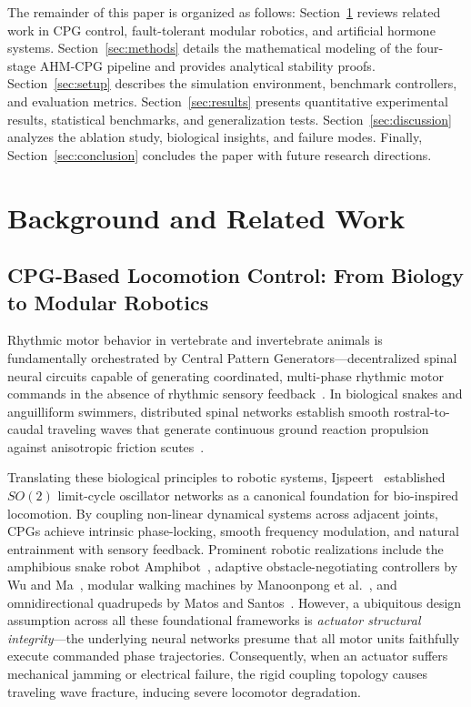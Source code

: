 \documentclass{iopjournal}
\begin{document}
The remainder of this paper is organized as follows: Section~\ref{sec:related} reviews related work in CPG control, fault-tolerant modular robotics, and artificial hormone systems. Section~\ref{sec:methods} details the mathematical modeling of the four-stage AHM-CPG pipeline and provides analytical stability proofs. Section~\ref{sec:setup} describes the simulation environment, benchmark controllers, and evaluation metrics. Section~\ref{sec:results} presents quantitative experimental results, statistical benchmarks, and generalization tests. Section~\ref{sec:discussion} analyzes the ablation study, biological insights, and failure modes. Finally, Section~\ref{sec:conclusion} concludes the paper with future research directions.

\section{Background and Related Work}
\label{sec:related}

\subsection{CPG-Based Locomotion Control: From Biology to Modular Robotics}
Rhythmic motor behavior in vertebrate and invertebrate animals is fundamentally orchestrated by Central Pattern Generators—decentralized spinal neural circuits capable of generating coordinated, multi-phase rhythmic motor commands in the absence of rhythmic sensory feedback~\cite{grillner2006,marder2001,delcomyn1980}. In biological snakes and anguilliform swimmers, distributed spinal networks establish smooth rostral-to-caudal traveling waves that generate continuous ground reaction propulsion against anisotropic friction scutes~\cite{dickinson2000,hirose1993}.

Translating these biological principles to robotic systems, Ijspeert~\cite{ijspeert2008} established $SO(2)$ limit-cycle oscillator networks as a canonical foundation for bio-inspired locomotion. By coupling non-linear dynamical systems across adjacent joints, CPGs achieve intrinsic phase-locking, smooth frequency modulation, and natural entrainment with sensory feedback. Prominent robotic realizations include the amphibious snake robot Amphibot~\cite{crespi2008}, adaptive obstacle-negotiating controllers by Wu and Ma~\cite{wu2010}, modular walking machines by Manoonpong et al.~\cite{manoonpong2007,manoonpong2013}, and omnidirectional quadrupeds by Matos and Santos~\cite{matos2014}. However, a ubiquitous design assumption across all these foundational frameworks is \textit{actuator structural integrity}—the underlying neural networks presume that all motor units faithfully execute commanded phase trajectories. Consequently, when an actuator suffers mechanical jamming or electrical failure, the rigid coupling topology causes traveling wave fracture, inducing severe locomotor degradation.
\end{document}

